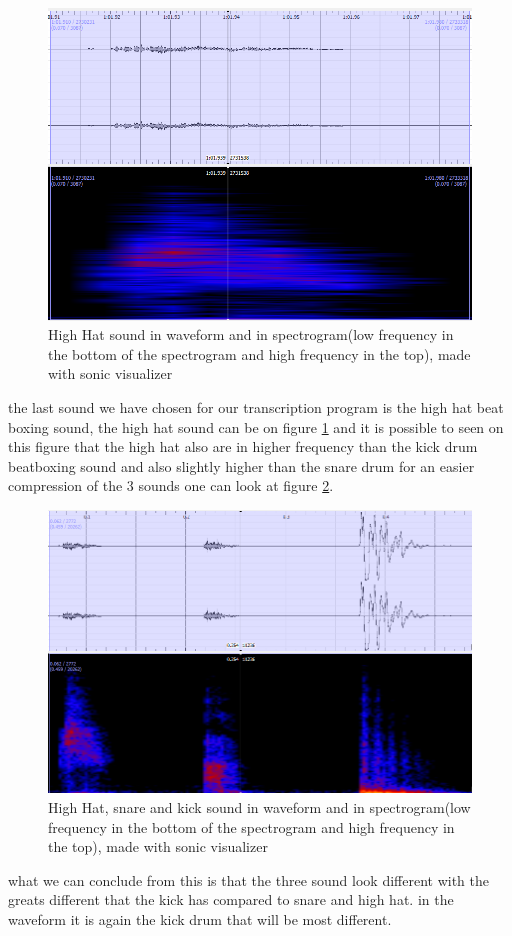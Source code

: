 \begin{figure}[h]
	\begin{center}
		\includegraphics[scale =  0.5]{fig/HH-close-up-with-spectrogram.png}
		\caption{High Hat sound in waveform and in spectrogram(low frequency in the bottom of the spectrogram and high frequency in the top), made with sonic visualizer}
		\label{HHCloseup}
	\end{center}
\end{figure}
the last sound we have chosen for our transcription program is the high hat beat boxing sound, the high hat sound can be on figure \ref{HHCloseup} and it is possible to seen on this figure that the high hat also are in higher frequency than the kick drum beatboxing sound and also slightly higher than the snare drum for an easier compression of the 3 sounds one can look at figure \ref{HH-Snare-Kick}.
\begin{figure}[h]
	\begin{center}
		\includegraphics[scale =  0.5]{fig/hh-snare-kick-with-spectogram.png}
		\caption{High Hat, snare and kick sound in waveform and in spectrogram(low frequency in the bottom of the spectrogram and high frequency in the top), made with sonic visualizer}
		\label{HH-Snare-Kick}
	\end{center}
\end{figure}
what we can conclude from this is that the three sound look different with the greats different that the kick has compared to snare and high hat. in the waveform it is again the kick drum that will be most different.
